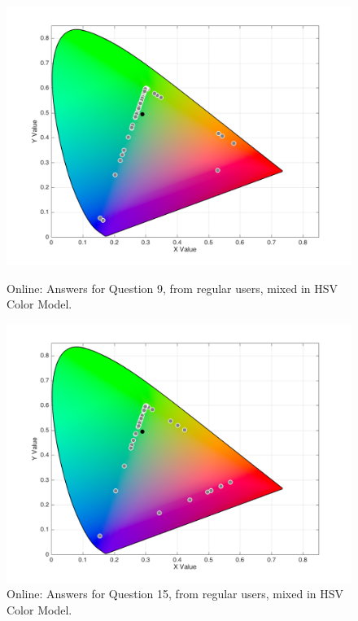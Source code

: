 \begin{figure}[htbp]
  \centering
  \vspace{-15pt}
  \begin{minipage}{0.4\textwidth}
    \centering
    \includegraphics[width=\textwidth]{images/results/9_online_HSVresponses.png}
    \caption[Online: Answers for Question 9, from regular users, mixed in HSV Color Model.]{Online: Answers for Question 9, from regular users, mixed in HSV Color Model.}
    \label{fig:onlinehsvregular_9}
  \end{minipage}
  \begin{minipage}{0.4\textwidth}
    \centering
    \includegraphics[width=\textwidth]{images/results/15_online_HSVresponses.png}
    \caption[Online: Answers for Question 15, from regular users, mixed in HSV Color Model.]{Online: Answers for Question 15, from regular users, mixed in HSV Color Model.}
    \label{fig:onlinehsvregular_15}
  \end{minipage}
  \vspace{-5pt}
\end{figure}
%

